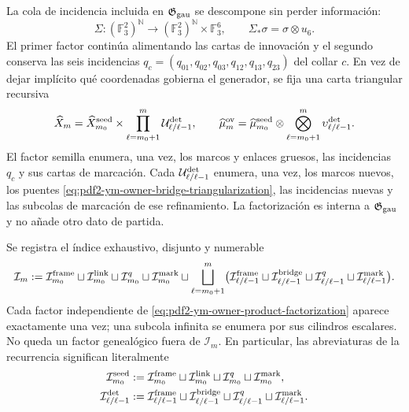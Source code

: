 La cola de incidencia incluida en $\mathfrak G_{\rm gau}$ se descompone sin perder
información:
\begin{equation}\label{eq:pdf2-ym-owner-seed-split}
 \Sigma:(\mathbb F_3^2)^{\mathbb N}\longrightarrow
 (\mathbb F_3^2)^{\mathbb N}\times\mathbb F_3^6,
 \qquad \Sigma_*\sigma=\sigma\otimes u_6.
\end{equation}
El primer factor continúa alimentando las cartas de innovación y el segundo conserva
las seis incidencias $q_c=(q_{01},q_{02},q_{03},q_{12},q_{13},q_{23})$ del collar
$c$. En vez de dejar implícito qué coordenadas gobierna el generador, se fija una
carta triangular recursiva
\begin{equation}\label{eq:pdf2-ym-owner-product-factorization}
 \widehat X_m
 =\widehat X_{m_0}^{\rm seed}
  \times\prod_{\ell=m_0+1}^{m}
       \mathcal U_{\ell/\ell-1}^{\rm det},
 \qquad
 \widehat\mu_m^{\rm ov}
 =\widehat\mu_{m_0}^{\rm seed}
  \otimes\bigotimes_{\ell=m_0+1}^{m}
       \upsilon_{\ell/\ell-1}^{\rm det}.
\end{equation}
El factor semilla enumera, una vez, los marcos y enlaces gruesos, las incidencias
$q_c$ y sus cartas de marcación. Cada
$\mathcal U_{\ell/\ell-1}^{\rm det}$ enumera, una vez, los marcos nuevos, los puentes
\eqref{eq:pdf2-ym-owner-bridge-triangularization}, las incidencias nuevas y las
subcolas de marcación de ese refinamiento. La factorización es interna a
$\mathfrak G_{\rm gau}$ y no añade otro dato de partida.

Se registra el índice exhaustivo, disjunto y numerable
\begin{equation}\label{eq:pdf2-ym-owner-exhaustive-index}
 \mathcal I_m
 :=\mathcal I_{m_0}^{\rm frame}
 \sqcup\mathcal I_{m_0}^{\rm link}
 \sqcup\mathcal I_{m_0}^{q}
 \sqcup\mathcal I_{m_0}^{\rm mark}
 \sqcup\bigsqcup_{\ell=m_0+1}^{m}
 \bigl(
   \mathcal I_{\ell/\ell-1}^{\rm frame}
   \sqcup\mathcal I_{\ell/\ell-1}^{\rm bridge}
   \sqcup\mathcal I_{\ell/\ell-1}^{q}
   \sqcup\mathcal I_{\ell/\ell-1}^{\rm mark}
 \bigr).
\end{equation}
Cada factor independiente de \eqref{eq:pdf2-ym-owner-product-factorization} aparece
exactamente una vez; una subcola infinita se enumera por sus cilindros escalares. No
queda un factor genealógico fuera de $\mathcal I_m$.
En particular, las abreviaturas de la recurrencia significan literalmente
\begin{equation}\label{eq:pdf2-ym-owner-index-abbreviations}
 \begin{aligned}
 \mathcal I_{m_0}^{\rm seed}
 &:={\mathcal I}_{m_0}^{\rm frame}\sqcup
    {\mathcal I}_{m_0}^{\rm link}\sqcup
    {\mathcal I}_{m_0}^{q}\sqcup
    {\mathcal I}_{m_0}^{\rm mark},\\
 \mathcal I_{\ell/\ell-1}^{\rm det}
 &:={\mathcal I}_{\ell/\ell-1}^{\rm frame}\sqcup
    {\mathcal I}_{\ell/\ell-1}^{\rm bridge}\sqcup
    {\mathcal I}_{\ell/\ell-1}^{q}\sqcup
    {\mathcal I}_{\ell/\ell-1}^{\rm mark}.
 \end{aligned}
\end{equation}

